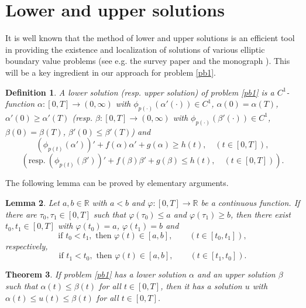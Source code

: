 \documentclass[11pt]{amsart}
\newtheorem{theorem}{Theorem}[section]
\newtheorem{definition}[theorem]{Definition}
\newtheorem{lemma}[theorem]{Lemma}
\numberwithin{equation}{section} \textwidth=15.5cm
\begin{document}
\section{Lower and upper solutions}\label{sectiunea2}

It is well known that the method of lower and upper solutions is an efficient tool in providing the existence and localization of solutions of various elliptic boundary value problems (see e.g. the survey paper \cite{[CoHa]} and the monograph \cite{CoHa1}).
This will be a key ingredient in our approach for problem \eqref{pb1}.

\begin{definition}\label{lusol}
\emph{A \textit{lower solution} (resp. \textit{upper solution}) of problem \eqref{pb1} is a $C^1$-function $\alpha:[0,T]\to(0,\infty)$ with $\phi_{p(\cdot )}(\alpha'( \cdot ))\in C^1$, $\alpha(0)=\alpha(T)$, $\alpha'(0)\geq\alpha'(T)$ (resp. $\beta:[0,T]\to(0,\infty)$ with $\phi_{p(\cdot )}(\beta'( \cdot ))\in C^1$, $\beta(0)=\beta(T)$, $\beta'(0)\leq\beta'(T)$) and
$$(\phi_{p(t)}(\alpha'))'+f(\alpha)\alpha'+g(\alpha)\geq h(t),\quad (t\in[0,T]),$$
$$\left(\mbox{resp.}\ (\phi_{p(t)}(\beta'))'+f(\beta)\beta'+g(\beta)\leq h(t),\quad (t\in [0,T])\right).$$}
\end{definition}
\smallskip

The following lemma can be proved by elementary arguments.
\begin{lemma}\label{elemlema}
Let $a,b\in\mathbb{R}$ with $a<b$ and $\varphi:[0,T]\to\mathbb{R}$ be a continuous function. If there are $\tau_0, \tau_1\in [0,T]$ such that $\varphi(\tau_0)\leq a$ and $\varphi(\tau_1) \geq b$, then there exist $t_0, t_1\in [0,T]$ with $\varphi(t_0)=a$, $\varphi(t_1)=b$ and
$$\mbox{if } t_0<t_1, \mbox{ then }\varphi(t)\in[a,b],\qquad  (t\in[t_0,t_1]),$$
respectively,
$$\mbox{if } t_1<t_0, \mbox{ then }\varphi(t)\in[a,b],\qquad  (t\in[t_1,t_0]).$$
\end{lemma}
\smallskip

\begin{theorem}\label{lemalu}
If problem \eqref{pb1} has a lower solution $\alpha$ and an upper solution $\beta$ such that $\alpha(t)\leq\beta(t)$ for all $t\in[0,T]$,  then it has a solution $u$ with $\alpha(t)\leq u(t)\leq\beta(t)$ for all $t\in[0,T]$.
\end{theorem}
\end{document}
